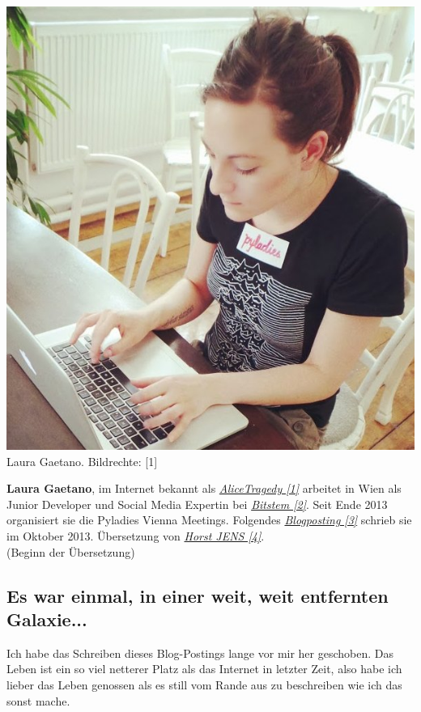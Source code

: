 \documentclass[10pt,a4paper,ngerman,twoside]{article} %
\begin{document}
\begin{multicols}{3}
\begin{center}
\includegraphics[width=\linewidth]{laura/laura-sitting.jpg}
\footnotesize{Laura Gaetano. Bildrechte: [1]}
\end{center}

\textbf{Laura Gaetano}, im Internet bekannt als \href{http://www.alicetragedy.org/blog/}{\textit{AliceTragedy [1]}} arbeitet in Wien als Junior Developer und Social Media Expertin bei \href{http://bitstem.com}{\textit{Bitstem [2]}}. Seit Ende 2013 organisiert sie die Pyladies Vienna Meetings. Folgendes \href{http://www.alicetragedy.org/blog/?p=6271}{\textit{Blogposting [3]}} schrieb sie im Oktober 2013. Übersetzung von \href{http://spielend-programmieren.at}{\textit{Horst JENS [4]}}. \\

(Beginn der Übersetzung) \\

\subsection*{Es war einmal, in einer weit, weit entfernten Galaxie...}

Ich habe das Schreiben dieses Blog-Postings lange vor mir her geschoben. Das Leben ist ein so viel netterer Platz als das Internet in letzter Zeit, also habe ich lieber das Leben genossen als es still vom Rande aus zu beschreiben wie ich das sonst mache.


\end{multicols}
\end{document}
